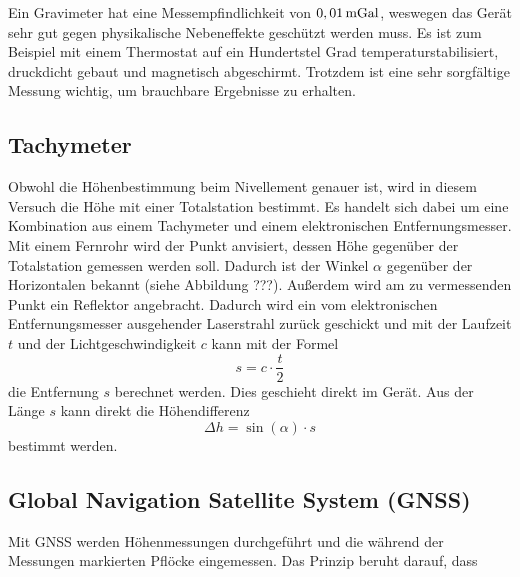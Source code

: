 Ein Gravimeter hat eine Messempfindlichkeit von $0,01\,\mathrm{mGal}$, weswegen das Gerät sehr gut gegen physikalische Nebeneffekte geschützt werden muss. Es ist zum Beispiel mit einem Thermostat auf ein Hundertstel Grad temperaturstabilisiert, druckdicht gebaut und magnetisch abgeschirmt. Trotzdem ist eine sehr sorgfältige Messung wichtig, um brauchbare Ergebnisse zu erhalten. 

\subsection{Tachymeter}

Obwohl die Höhenbestimmung beim Nivellement genauer ist, wird in diesem Versuch die Höhe mit einer Totalstation bestimmt. Es handelt sich dabei um eine Kombination aus einem Tachymeter und einem elektronischen Entfernungsmesser. Mit einem Fernrohr wird der Punkt anvisiert, dessen Höhe gegenüber der Totalstation gemessen werden soll. Dadurch ist der Winkel $\alpha$ gegenüber der Horizontalen bekannt (siehe Abbildung ???). Außerdem wird am zu vermessenden Punkt ein Reflektor angebracht. Dadurch wird ein vom elektronischen Entfernungsmesser ausgehender Laserstrahl zurück geschickt und mit der Laufzeit $t$ und der Lichtgeschwindigkeit $c$ kann mit der Formel
\begin{equation}
 s=c\cdot \frac{t}{2}
\end{equation}
die Entfernung $s$ berechnet werden. Dies geschieht direkt im Gerät. Aus der Länge $s$ kann direkt die Höhendifferenz
\begin{equation}
 \Delta h=\sin(\alpha)\cdot s
\end{equation}
bestimmt werden. 

\subsection{Global Navigation Satellite System (GNSS)}

Mit GNSS werden Höhenmessungen durchgeführt und die während der Messungen markierten Pflöcke eingemessen. Das Prinzip beruht darauf, dass 

